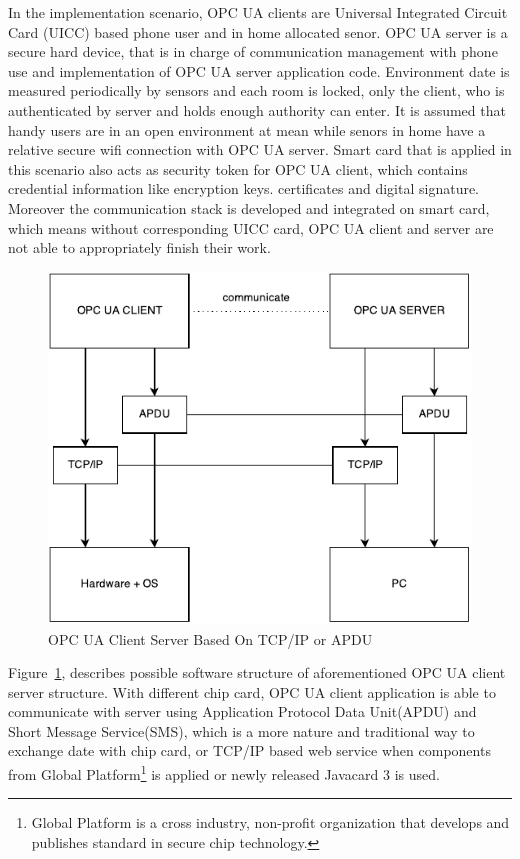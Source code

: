 \documentclass[]{llncs}
\begin{document}
In the implementation scenario, OPC UA clients are Universal Integrated Circuit Card (UICC)  based phone user and in home allocated senor. OPC UA server is a secure hard device, that is in charge of communication management with phone use and implementation of OPC UA server application code. Environment date is measured periodically by sensors and each room is locked, only the client, who is authenticated by server and holds enough authority can enter. It is assumed that handy users are in an open environment at mean while senors in home have a relative secure wifi connection with OPC UA server. Smart card that is applied in this scenario also acts as security token for OPC UA client, which contains credential information like encryption keys. certificates and digital signature. Moreover the communication stack is developed and integrated on smart card, which means without corresponding UICC card, OPC UA client and server are not able to appropriately finish their work.
 \begin{figure}[ht]
	\centering
	\includegraphics[width=1\textwidth]{softwareStructure}
		\caption[ ]{OPC UA Client Server Based On TCP/IP or APDU}
	\label{fig:softwareStructure}
\end{figure}

Figure~\ref{fig:softwareStructure}, describes possible software structure of aforementioned OPC UA client server structure. With different chip card, OPC UA client application is able to communicate with server using Application Protocol Data Unit(APDU) and Short Message Service(SMS), which is a more nature and traditional way to exchange date with chip card, or TCP/IP based web service when components from Global Platform\footnote{Global Platform is a cross industry, non-profit organization that develops and publishes standard in secure chip technology.} is applied or newly released Javacard 3 is used.  
\end{document}
